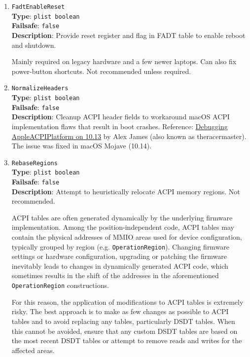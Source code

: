 \documentclass[]{article}
\begin{document}
\begin{enumerate}

\item
  \texttt{FadtEnableReset}\\
  \textbf{Type}: \texttt{plist\ boolean}\\
  \textbf{Failsafe}: \texttt{false}\\
  \textbf{Description}: Provide reset register and flag in FADT table to enable
  reboot and shutdown.

  Mainly required on legacy hardware and a few newer laptops.
  Can also fix power-button shortcuts. Not recommended unless required.

\item
  \texttt{NormalizeHeaders}\\
  \textbf{Type}: \texttt{plist\ boolean}\\
  \textbf{Failsafe}: \texttt{false}\\
  \textbf{Description}: Cleanup ACPI header fields to workaround macOS
  ACPI implementation flaws that result in boot crashes. Reference:
  \href{https://alextjam.es/debugging-appleacpiplatform/}{Debugging
  AppleACPIPlatform on 10.13} by Alex James (also known as theracermaster).
  The issue was fixed in macOS Mojave (10.14).

\item
  \texttt{RebaseRegions}\\
  \textbf{Type}: \texttt{plist\ boolean}\\
  \textbf{Failsafe}: \texttt{false}\\
  \textbf{Description}: Attempt to heuristically relocate ACPI memory
  regions. Not recommended.

  ACPI tables are often generated dynamically by the underlying firmware
  implementation. Among the position-independent code, ACPI tables may
  contain the physical addresses of MMIO areas used for device
  configuration, typically grouped by region (e.g.
  \texttt{OperationRegion}). Changing firmware settings or hardware
  configuration, upgrading or patching the firmware inevitably leads to
  changes in dynamically generated ACPI code, which sometimes results in
  the shift of the addresses in the aforementioned \texttt{OperationRegion}
  constructions.

  For this reason, the application of modifications to ACPI tables is extremely
  risky. The best approach is to make as few changes as possible to ACPI tables
  and to avoid replacing any tables, particularly DSDT tables. When this cannot be
  avoided, ensure that any custom DSDT tables are based on the most recent DSDT
  tables or attempt to remove reads and writes for the affected areas.


\end{enumerate}
\end{document}
